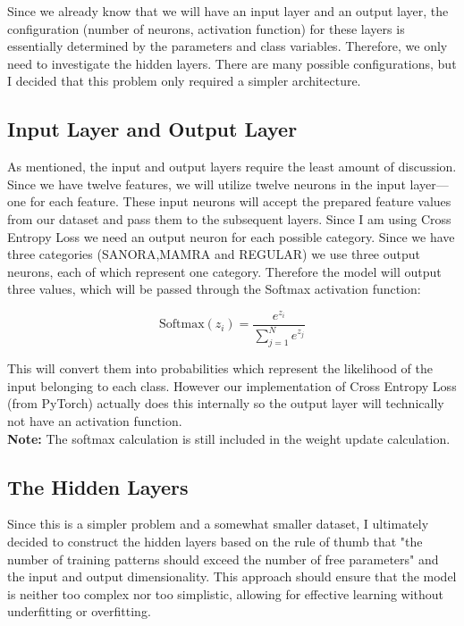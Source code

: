 \documentclass[conference]{IEEEtran}
\begin{document}
Since we already know that we will have an input layer and an output layer, the configuration (number of neurons, activation function) for these layers is essentially determined by the parameters and class variables. Therefore, we only need to investigate the hidden layers. There are many possible configurations, but I decided that this problem only required a simpler architecture. \\


\subsection{Input Layer and Output Layer}
As mentioned, the input and output layers require the least amount of discussion. Since we have twelve features, we will utilize twelve neurons in the input layer—one for each feature. These input neurons will accept the prepared feature values from our dataset and pass them to the subsequent layers. Since I am using Cross Entropy Loss we need an output neuron for each possible category. Since we have three categories (SANORA,MAMRA and REGULAR) we use three output neurons, each of which represent one category. Therefore the model will output three values, which will be passed through the Softmax activation function:
 
\[
\text{Softmax}(z_i) = \frac{e^{z_i}}{\sum_{j=1}^{N} e^{z_j}}
\]

This will convert them into probabilities which represent the likelihood of the input belonging to each class. However our implementation of Cross Entropy Loss (from PyTorch) actually does this internally so the output layer will technically not have an activation function.\\

\textbf{Note:} The softmax calculation is still included in the weight update calculation.\\

\subsection{The Hidden Layers}
Since this is a simpler problem and a somewhat smaller dataset, I ultimately decided to construct the hidden layers based on the rule of thumb that "the number of training patterns should exceed the number of free parameters" and the input and output dimensionality. This approach should ensure that the model is neither too complex nor too simplistic, allowing for effective learning without underfitting or overfitting.\\
\end{document}
